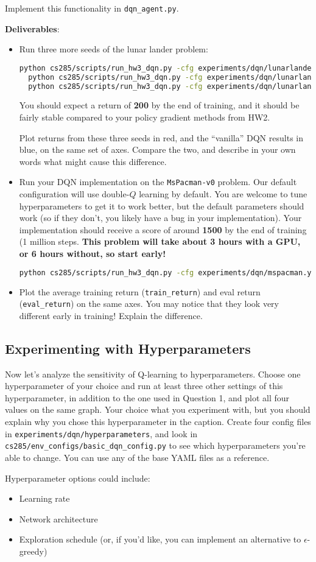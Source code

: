 Implement this functionality in \verb|dqn_agent.py|.

\textbf{Deliverables}:
\begin{itemize}
    \item Run three more seeds of the lunar lander problem:
\begin{lstlisting}[language=bash,breaklines=true]
  python cs285/scripts/run_hw3_dqn.py -cfg experiments/dqn/lunarlander_doubleq.yaml --seed 1
  python cs285/scripts/run_hw3_dqn.py -cfg experiments/dqn/lunarlander_doubleq.yaml --seed 2
  python cs285/scripts/run_hw3_dqn.py -cfg experiments/dqn/lunarlander_doubleq.yaml --seed 3
\end{lstlisting}
    You should expect a return of \textbf{200} by the end of training, and it should be fairly stable compared to your policy gradient methods from HW2.
    
    Plot returns from these three seeds in red, and the ``vanilla'' DQN results in blue, on the same set of axes. Compare the two, and describe in your own words what might cause this difference.

    \item Run your DQN implementation on the \verb|MsPacman-v0| problem. Our default configuration will use double-$Q$ learning by default. You are welcome to tune hyperparameters to get it to work better, but the default parameters should work (so if they don't, you likely have a bug in your implementation). Your implementation should receive a score of around \textbf{1500} by the end of training (1 million steps. \textbf{This problem will take about 3 hours with a GPU, or {\color{red} 6 hours} without, so start early!}
    \begin{lstlisting}[language=bash,breaklines=true]
    python cs285/scripts/run_hw3_dqn.py -cfg experiments/dqn/mspacman.yaml
    \end{lstlisting}
    \item Plot the average training return (\verb|train_return|) and eval return (\verb|eval_return|) on the same axes. You may notice that they look very different early in training! Explain the difference.
\end{itemize}

\subsection{Experimenting with Hyperparameters} Now let's analyze the sensitivity of Q-learning to hyperparameters. Choose one hyperparameter of your choice and run at least three other settings of this hyperparameter, in addition to the one used in Question 1, and plot all four values on the same graph. Your choice what you experiment with, but you should explain why you chose this hyperparameter in the caption. Create four config files in \verb|experiments/dqn/hyperparameters|, and look in \verb|cs285/env_configs/basic_dqn_config.py| to see which hyperparameters you're able to change. You can use any of the base YAML files as a reference.

Hyperparameter options could include:
\begin{itemize}
    \item Learning rate
    \item Network architecture
    \item Exploration schedule (or, if you'd like, you can implement an alternative to $\epsilon$-greedy)
\end{itemize}